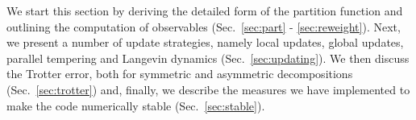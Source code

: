 



We start this section by deriving the detailed form of the partition function and outlining the computation of observables (Sec.~\ref{sec:part} - \ref{sec:reweight}). 
Next, we present a number of update strategies, namely local updates, global updates,  parallel tempering  and Langevin dynamics  (Sec.~\ref{sec:updating}). 
We then discuss the Trotter error, both for symmetric and asymmetric decompositions (Sec.~\ref{sec:trotter}) and, finally, we describe the measures we have implemented to make the code numerically stable (Sec.~\ref{sec:stable}).

